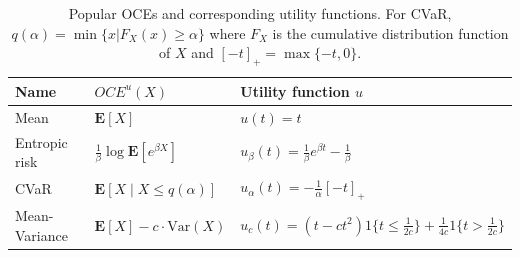 \documentclass[11pt]{article}
\newcommand{\1}{\mathbbm{1}}
\newcommand{\gao}[1]{\textcolor{blue}{{#1}}} %
\begin{document}

\begin{table}[t]
\caption{Popular OCEs and corresponding utility functions. For CVaR, $q(\alpha)= \min\{x\vert F_X(x)\geq \alpha\}$ where $F_X$ is the cumulative distribution function of $X$ and $[-t]_{+}=\max\{-t,0\}$.} %
\label{TABLE1}
\vskip 0.1in
\begin{center}
\renewcommand\arraystretch{1.25}
\begin{small}
\begin{tabular}{lll}
\hline Name & $OCE^u(X)$  & Utility function $u$ \\
\hline Mean & $\mathbf{E}[X]$ & $u(t)=t$ \\
Entropic risk & $\frac{1}{\beta} \log \mathbf{E}\left[e^{\beta X}\right]$ & $u_\beta(t)=\frac{1}{\beta} e^{\beta t}-\frac{1}{\beta}$ \\
CVaR & $\mathbf{E}\left[X \mid X\leq q\left(\alpha\right)\right]$ & $u_\alpha(t)=-\frac{1}{\alpha}[-t]_+$ \\
Mean-Variance & $\mathbf{E}[X]-c \cdot \text{Var}(X)$ & $u_c(t)=(t-ct^2)1\{t\leq \frac{1}{2c}\}+\frac{1}{4c}1\{t> \frac{1}{2c}\}$ \\


\hline
\end{tabular}
\end{small}
\end{center}
\vskip -0.1in
\end{table}



\end{document}
